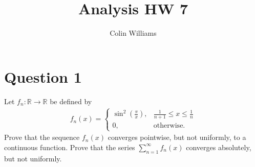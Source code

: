 \documentclass[10pt,a4paper]{article}
\title{Analysis HW 7}
\author{Colin Williams}
\theoremstyle{definition}
\theoremstyle{definition}
\numberwithin{equation}{section}
\begin{document}
\maketitle

\section*{Question 1}
Let $f_n: \mathbb{R} \to \mathbb{R}$ be defined by 
\begin{align*}
f_n(x) = \begin{cases}
\sin^2\left(\frac{\pi}{x}\right), &\frac{1}{n + 1} \leq x \leq \frac{1}{n}\\
0, &\text{otherwise.}
\end{cases}
\end{align*}
Prove that the sequence $f_n(x)$ converges pointwise, but not uniformly, to a continuous function. Prove that the series $\sum_{n = 1}^\infty f_n(x)$ converges absolutely, but not uniformly. 
\end{document}
